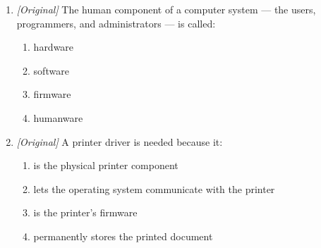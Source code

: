 \documentclass[11pt]{article}
\begin{document}
\begin{enumerate}[label=\textbf{Q\arabic*.}, leftmargin=*]
  hardware?
  \begin{enumerate}[label=\Alph*.]
    \item Motherboard
    \item Printer
    \item Device driver
    \item Keyboard
  \end{enumerate}
\item \textit{[Original]} The human component of a computer system --- the
  users, programmers, and administrators --- is called:
  \begin{enumerate}[label=\Alph*.]
    \item hardware
    \item software
    \item firmware
    \item humanware
  \end{enumerate}
\item \textit{[Original]} A printer driver is needed because it:
  \begin{enumerate}[label=\Alph*.]
    \item is the physical printer component
    \item lets the operating system communicate with the printer
    \item is the printer's firmware
    \item permanently stores the printed document
  \end{enumerate}


\end{enumerate}
\end{document}
